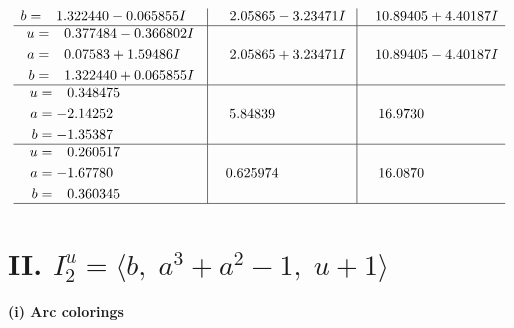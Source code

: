 \documentclass[1p]{elsarticle_modified}
\theoremstyle{definition}
\begin{document}
$$\begin{array}{c|c|c}
\begin{aligned}
b &= \phantom{-}1.322440 - 0.065855 I\end{aligned}
 & \phantom{-}2.05865 - 3.23471 I & \phantom{-}10.89405 + 4.40187 I \\ \hline\begin{aligned}
u &= \phantom{-}0.377484 - 0.366802 I \\
a &= \phantom{-}0.07583 + 1.59486 I \\
b &= \phantom{-}1.322440 + 0.065855 I\end{aligned}
 & \phantom{-}2.05865 + 3.23471 I & \phantom{-}10.89405 - 4.40187 I \\ \hline\begin{aligned}
u &= \phantom{-}0.348475\phantom{ +0.000000I} \\
a &= -2.14252\phantom{ +0.000000I} \\
b &= -1.35387\phantom{ +0.000000I}\end{aligned}
 & \phantom{-}5.84839\phantom{ +0.000000I} & \phantom{-}16.9730\phantom{ +0.000000I} \\ \hline\begin{aligned}
u &= \phantom{-}0.260517\phantom{ +0.000000I} \\
a &= -1.67780\phantom{ +0.000000I} \\
b &= \phantom{-}0.360345\phantom{ +0.000000I}\end{aligned}
 & \phantom{-}0.625974\phantom{ +0.000000I} & \phantom{-}16.0870\phantom{ +0.000000I}\\
 \hline 
 \end{array}$$\newpage\newpage\renewcommand{\arraystretch}{1}
\centering \section*{II. $I^u_{2}= \langle b,\;a^3+a^2-1,\;u+1 \rangle$}
\flushleft \textbf{(i) Arc colorings}\\
\end{document}
